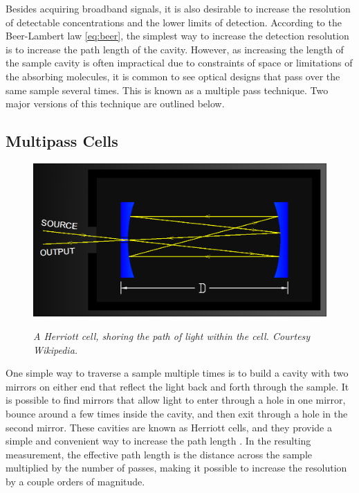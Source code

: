 Besides acquiring broadband signals, it is also desirable to increase the
resolution of detectable concentrations and the lower limits of detection.
According to the Beer-Lambert law \eqref{eq:beer}, the simplest way to increase
the detection resolution is to increase the path length of the cavity. However,
as increasing the length of the sample cavity is often impractical due to
constraints of space or limitations of the absorbing molecules, it is common to
see optical designs that pass over the same sample several times. This is known
as a multiple pass technique. Two major versions of this technique are outlined
below.



\subsection{Multipass Cells}\label{subsec:herriott}


\begin{figure}
\begin{center}
  \includegraphics[width=\marginspace]{figures/herriott.png}
\end{center}
\emph{\footnotesize{A Herriott cell, shoring the path of light within the cell. Courtesy Wikipedia.}}
\end{figure}

One simple way to traverse a sample multiple times is to build a cavity with
two mirrors on either end that reflect the light back and forth through the
sample. It is possible to find mirrors that allow light to enter through a hole
in one mirror, bounce around a few times inside the cavity, and then exit
through a hole in the second mirror. These cavities are known as Herriott
cells, and they provide a simple and convenient way to increase the path
length \cite{Engel:2007va}. In the resulting measurement, the effective path
length is the distance across the sample multiplied by the number of passes,
making it possible to increase the resolution by a couple orders of magnitude.

